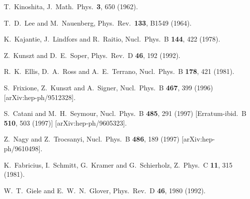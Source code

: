 \documentclass[12pt]{iopart}
\begin{document}
\begin{thebibliography}{99}
  T.~Kinoshita,
  J.\ Math.\ Phys.\  {\bf 3}, 650 (1962).
  
  T.~D.~Lee and M.~Nauenberg,
  Phys.\ Rev.\  {\bf 133}, B1549 (1964).

  K.~Kajantie, J.~Lindfors and R.~Raitio,
  Nucl.\ Phys.\ B {\bf 144}, 422 (1978).

  Z.~Kunszt and D.~E.~Soper,
  Phys.\ Rev.\ D {\bf 46}, 192 (1992).

  R.~K.~Ellis, D.~A.~Ross and A.~E.~Terrano,
  Nucl.\ Phys.\ B {\bf 178}, 421 (1981).
  
  S.~Frixione, Z.~Kunszt and A.~Signer,
  Nucl.\ Phys.\ B {\bf 467}, 399 (1996)
  [arXiv:hep-ph/9512328].
  
  S.~Catani and M.~H.~Seymour,
  Nucl.\ Phys.\ B {\bf 485}, 291 (1997)
  [Erratum-ibid.\ B {\bf 510}, 503 (1997)]
  [arXiv:hep-ph/9605323].

  Z.~Nagy and Z.~Trocsanyi,
  Nucl.\ Phys.\ B {\bf 486}, 189 (1997)
  [arXiv:hep-ph/9610498].
  
  K.~Fabricius, I.~Schmitt, G.~Kramer and G.~Schierholz,
  Z.\ Phys.\ C {\bf 11}, 315 (1981).
  
  W.~T.~Giele and E.~W.~N.~Glover,
  Phys.\ Rev.\ D {\bf 46}, 1980 (1992).



\end{thebibliography}
\end{document}
